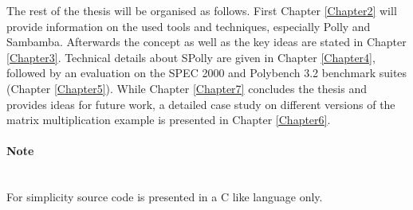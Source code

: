 

The rest of the thesis will be organised as follows. 
First Chapter \ref{Chapter2} will provide information on the used tools and techniques,
especially Polly and Sambamba. Afterwards the concept as well as the key ideas 
are stated in Chapter \ref{Chapter3}. 
Technical details about SPolly are given in Chapter \ref{Chapter4}, followed by 
an evaluation on the SPEC 2000 and Polybench 3.2 benchmark suites 
(Chapter \ref{Chapter5}). 
While Chapter \ref{Chapter7} concludes the thesis and provides ideas for
future work, a detailed case study on different versions of the matrix 
multiplication example is presented in Chapter \ref{Chapter6}. 

\paragraph*{Note} ~ \\
For simplicity source code is presented in a C like language only.



